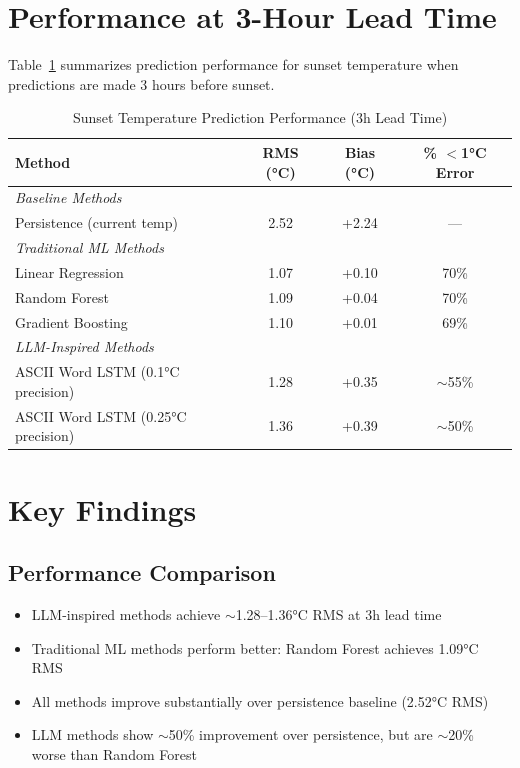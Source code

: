 \documentclass[11pt]{article}
\begin{document}
\section{Performance at 3-Hour Lead Time}

Table~\ref{tab:results} summarizes prediction performance for sunset temperature when predictions are made 3 hours before sunset.

\begin{table}[h]
\centering
\caption{Sunset Temperature Prediction Performance (3h Lead Time)}
\label{tab:results}
\begin{tabular}{lccc}
\toprule
\textbf{Method} & \textbf{RMS (°C)} & \textbf{Bias (°C)} & \textbf{\% $<$1°C Error} \\
\midrule
\multicolumn{4}{l}{\textit{Baseline Methods}} \\
Persistence (current temp) & 2.52 & +2.24 & --- \\
\midrule
\multicolumn{4}{l}{\textit{Traditional ML Methods}} \\
Linear Regression & 1.07 & +0.10 & 70\% \\
Random Forest & 1.09 & +0.04 & 70\% \\
Gradient Boosting & 1.10 & +0.01 & 69\% \\
\midrule
\multicolumn{4}{l}{\textit{LLM-Inspired Methods}} \\
ASCII Word LSTM (0.1°C precision) & 1.28 & +0.35 & $\sim$55\% \\
ASCII Word LSTM (0.25°C precision) & 1.36 & +0.39 & $\sim$50\% \\
\bottomrule
\end{tabular}
\end{table}

\section{Key Findings}

\subsection{Performance Comparison}
\begin{itemize}
    \item LLM-inspired methods achieve $\sim$1.28--1.36°C RMS at 3h lead time
    \item Traditional ML methods perform better: Random Forest achieves 1.09°C RMS
    \item All methods improve substantially over persistence baseline (2.52°C RMS)
    \item LLM methods show $\sim$50\% improvement over persistence, but are $\sim$20\% worse than Random Forest
\end{itemize}
\end{document}
